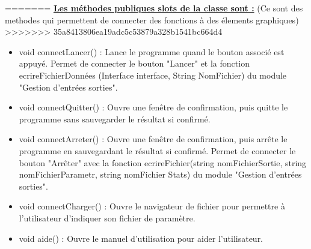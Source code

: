 \documentclass[a4paper,11pt]{article}
\begin{document}
=======
			\underline{\bf Les méthodes publiques slots de la classe sont :} (Ce sont des methodes qui permettent de connecter des fonctions à des élements graphiques)\\
>>>>>>> 35a8413806ea19adc5c53879a328b1541bc664d4
			\begin{itemize}
				\item void connectLancer() : Lance le programme quand le bouton associé est appuyé. Permet de connecter le bouton "Lancer" et la fonction ecrireFichierDonnées (Interface interface, String NomFichier) du module "Gestion d'entrées sorties".\vspace{0.2cm}
				\item void connectQuitter() : Ouvre une fenêtre de confirmation, puis quitte le programme sans sauvegarder le résultat si confirmé.\vspace{0.2cm}
				\item void connectArreter() : Ouvre une fenêtre de confirmation, puis arrête le programme en sauvegardant le résultat si confirmé. Permet de connecter le bouton "Arrêter" avec la fonction ecrireFichier(string nomFichierSortie, string nomFichierParametr, string nomFichier Stats) du module "Gestion d'entrées sorties".\vspace{0.2cm} 
				\item void connectCharger() : Ouvre le navigateur de fichier pour permettre à l’utilisateur d’indiquer son fichier de paramètre.\vspace{0.2cm}
				\item void aide() : Ouvre le manuel d’utilisation pour aider l’utilisateur.\\
			\end{itemize}
			
\end{document}
